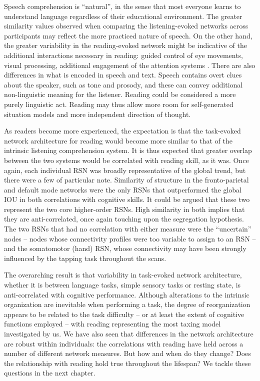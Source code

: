 Speech comprehension is ``natural'', in the sense that most everyone learns to understand language regardless of their educational environment. The greater similarity values observed when comparing the listening-evoked networks across participants may reflect the more practiced nature of speech. On the other hand, the greater variability in the reading-evoked network might be indicative of the additional interactions necessary in reading: guided control of eye movements, visual processing, additional engagement of the attention systems \citep{Mattingly1971, Rayner2006}. There are also differences in what is encoded in speech and text.  Speech contains overt clues about the speaker, such as tone and prosody, and these can convey additional non-linguistic meaning for the listener. Reading could be considered a more purely linguistic act. Reading may thus allow more room for self-generated situation models and more independent direction of thought. 

As readers become more experienced, the expectation is that the task-evoked network architecture for reading would become more similar to that of the intrinsic listening comprehension system. It is thus expected that greater overlap between the two systems would be correlated with reading skill, as it was. Once again, each individual RSN was broadly representative of the global trend, but there were a few of particular note. Similarity of structure in the fronto-parietal and default mode networks were the only RSNs that outperformed the global IOU in both correlations with cognitive skills. It could be argued that these two represent the two core higher-order RSNs. High similarity in both implies that they are anti-correlated, once again touching upon the segregation hypothesis. The two RSNs that had no correlation with either measure were the ``uncertain'' nodes -- nodes whose connectivity profiles were too variable to assign to an RSN -- and the somatomotor (hand) RSN, whose connectivity may have been strongly influenced by the tapping task throughout the scans. 

%
The overarching result is that variability in task-evoked network architecture, whether it is between language tasks, simple sensory tasks or resting state, is anti-correlated with cognitive performance. Although alterations to the intrinsic organization are inevitable when performing a task, the degree of reorganization appears to be related to the task difficulty -- or at least the extent of cognitive functions employed -- with reading representing the most taxing model investigated by us. We have also seen that differences in the network architecture are robust within individuals: the correlations with reading have held across a number of different network measures. But how and when do they change? Does the relationship with reading hold true throughout the lifespan? We tackle these questions in the next chapter. 